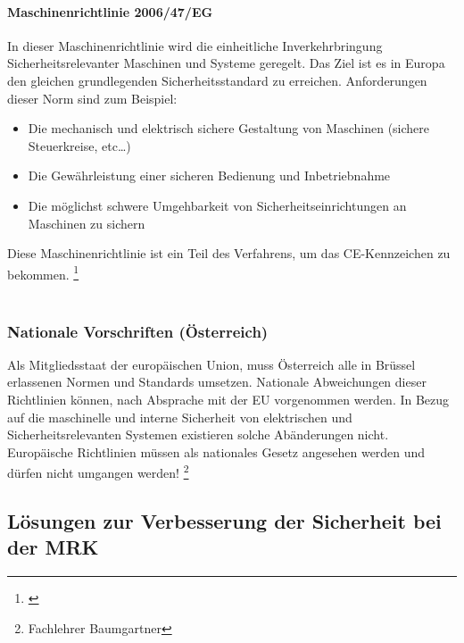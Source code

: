 \documentclass[titlepage,12pt,twoside]{article}
\begin{document}
\paragraph{Maschinenrichtlinie 2006/47/EG}
\hfill \break
\hfill \break
In dieser Maschinenrichtlinie wird die einheitliche Inverkehrbringung 
Sicherheitsrelevanter Maschinen und Systeme geregelt. Das Ziel ist es in Europa 
den gleichen grundlegenden Sicherheitsstandard zu erreichen. Anforderungen dieser 
Norm sind zum Beispiel: \\
\begin{itemize}
	\item Die mechanisch und elektrisch sichere Gestaltung von Maschinen (sichere Steuerkreise, etc…)
	\item Die Gewährleistung einer sicheren Bedienung und Inbetriebnahme
	\item Die möglichst schwere Umgehbarkeit von Sicherheitseinrichtungen an Maschinen zu sichern
\end{itemize}
\hfill \break
Diese Maschinenrichtlinie ist ein Teil des Verfahrens, um das CE-Kennzeichen zu 
bekommen. \footnote{\cite{TÜVsüd}}\\
\\
\subsubsection{Nationale Vorschriften (Österreich)}
Als Mitgliedsstaat der europäischen Union, muss Österreich alle in Brüssel 
erlassenen Normen und Standards umsetzen. Nationale Abweichungen dieser Richtlinien 
können, nach Absprache mit der EU vorgenommen werden. In Bezug auf die maschinelle 
und interne Sicherheit von elektrischen und Sicherheitsrelevanten Systemen existieren 
solche Abänderungen nicht. \\
Europäische Richtlinien müssen als nationales Gesetz angesehen werden und dürfen 
nicht umgangen werden! \footnote{Fachlehrer Baumgartner} \\
\newpage
\subsection{Lösungen zur Verbesserung der Sicherheit bei der MRK}
\label{chap:Lösungen zur Verbesserung der Sicherheit bei der MRK}
\end{document}
